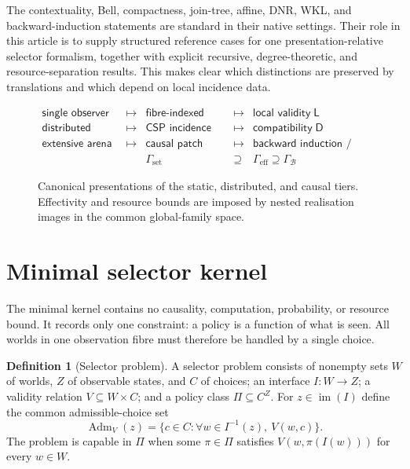 \documentclass[11pt]{article}
\theoremstyle{plain}
\theoremstyle{definition}
\newtheorem{definition}[theorem]{Definition}
\theoremstyle{remark}
\newcommand{\im}{\operatorname{im}}
\newcommand{\Adm}{\operatorname{Adm}}
\begin{document}
The contextuality, Bell, compactness, join-tree, affine, DNR, WKL, and
backward-induction statements are standard in their native settings. Their role
in this article is to supply structured reference cases for one presentation-relative
selector formalism, together with explicit recursive, degree-theoretic, and
resource-separation results. This makes clear which distinctions are preserved
by translations and which depend on local incidence data.

\begin{figure}[htbp]
\centering
\[
\begin{array}{rclcl}
\textsf{single observer}
&\longmapsto&
\textsf{fibre-indexed selector}
&\longmapsto&
\textsf{local validity}\;\mathsf L
\\[1mm]
\textsf{distributed observers}
&\longmapsto&
\textsf{CSP incidence diagram}
&\longmapsto&
\textsf{compatibility}\;\mathsf D
\\[1mm]
\textsf{extensive arena}
&\longmapsto&
\textsf{causal patch sheaf}
&\longmapsto&
\textsf{backward induction / matching}
\\[2mm]
&&
\Gamma_{\mathrm{set}}
&\supseteq&
\Gamma_{\mathrm{eff}}\supseteq\Gamma_{\mathcal B}
\end{array}
\]
\caption{Canonical presentations of the static, distributed, and causal tiers.
Effectivity and resource bounds are imposed by nested realisation images in the
common global-family space.}
\label{fig:architecture}
\end{figure}

\section{Minimal selector kernel}\label{sec:kernel}

The minimal kernel contains no causality, computation, probability, or resource
bound. It records only one constraint: a policy is a function of what is seen.
All worlds in one observation fibre must therefore be handled by a single
choice.

\begin{definition}[Selector problem]\label{def:selector}
A selector problem consists of nonempty sets $W$ of worlds, $Z$ of observable
states, and $C$ of choices; an interface $I:W\to Z$; a validity relation
$V\subseteq W\times C$; and a policy class $\Pi\subseteq C^Z$. For
$z\in\im(I)$ define the common admissible-choice set
\[
\Adm_V(z)=\{c\in C:\forall w\in I^{-1}(z),\ V(w,c)\}.
\]
The problem is capable in $\Pi$ when some $\pi\in\Pi$ satisfies
$V(w,\pi(I(w)))$ for every $w\in W$.
\end{definition}
\end{document}
